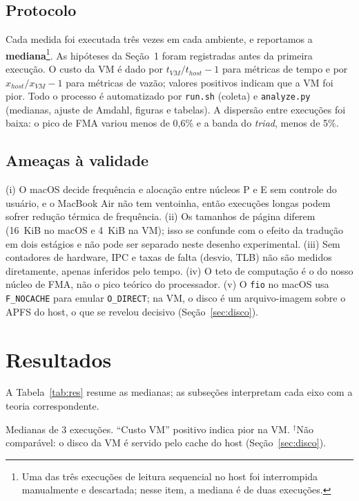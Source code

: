 \documentclass[12pt]{article}
\newcommand{\pend}[1]{\ifmmode\text{\textcolor{red}{[PREENCHER: #1]}}\else\textcolor{red}{[PREENCHER: #1]}\fi}
\begin{document}
\subsection{Protocolo}

Cada medida foi executada três vezes em cada ambiente, e reportamos a
\textbf{mediana}\footnote{Uma das três execuções de leitura sequencial no host
foi interrompida manualmente e descartada; nesse item, a mediana é de duas
execuções.}. As hipóteses da Seção~1 foram registradas antes da primeira
execução. O custo da VM é dado por $t_{VM}/t_{host} - 1$ para métricas de
tempo e por $x_{host}/x_{VM} - 1$ para métricas de vazão; valores positivos
indicam que a VM foi pior. Todo o processo é automatizado por
\texttt{run.sh} (coleta) e \texttt{analyze.py} (medianas, ajuste de Amdahl,
figuras e tabelas). A dispersão entre execuções foi baixa: o pico de FMA
variou menos de 0,6\% e a banda do \emph{triad}, menos de 5\%.

\subsection{Ameaças à validade}

(i) O macOS decide frequência e alocação entre núcleos P e E sem controle do
usuário, e o MacBook Air não tem ventoinha, então execuções longas podem sofrer
redução térmica de frequência. (ii) Os tamanhos de página diferem (16~KiB no
macOS e 4~KiB na VM); isso se confunde com o efeito da tradução em dois
estágios e não pode ser separado neste desenho experimental. (iii) Sem
contadores de hardware, IPC e taxas de falta (desvio, TLB) não são medidos
diretamente, apenas inferidos pelo tempo. (iv) O teto de computação é o do
nosso núcleo de FMA, não o pico teórico do processador. (v) O \texttt{fio} no
macOS usa \texttt{F\_NOCACHE} para emular \texttt{O\_DIRECT}; na VM, o disco é
um arquivo-imagem sobre o APFS do host, o que se revelou decisivo
(Seção~\ref{sec:disco}).

\section{Resultados}

A Tabela~\ref{tab:res} resume as medianas; as subseções interpretam cada eixo
com a teoria correspondente.

\begin{table}[ht]
\centering
\caption{Medianas de 3 execuções. ``Custo VM'' positivo indica pior na VM.
$^\dagger$Não comparável: o disco da VM é servido pelo cache do host
(Seção~\ref{sec:disco}).}
\label{tab:res}
\small
\IfFileExists{tabela.tex}{}{\pend{rodar analyze.py para gerar a tabela}}
\end{table}
\end{document}
